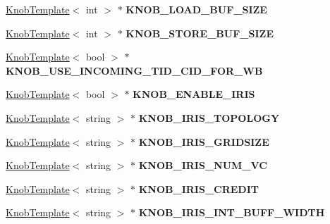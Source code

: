 \begin{DoxyCompactItemize}
\item 
\hypertarget{classall__knobs__c_ae0bb0c99188ceb39ac94fb6edba97e9d}{
\hyperlink{classKnobTemplate}{KnobTemplate}$<$ int $>$ $\ast$ {\bfseries KNOB\_\-LOAD\_\-BUF\_\-SIZE}}
\label{classall__knobs__c_ae0bb0c99188ceb39ac94fb6edba97e9d}

\item 
\hypertarget{classall__knobs__c_a403054f8d87ad3b9a664a2d6f05aff60}{
\hyperlink{classKnobTemplate}{KnobTemplate}$<$ int $>$ $\ast$ {\bfseries KNOB\_\-STORE\_\-BUF\_\-SIZE}}
\label{classall__knobs__c_a403054f8d87ad3b9a664a2d6f05aff60}

\item 
\hypertarget{classall__knobs__c_aa77af503bc3731e47846a690c1c3f21d}{
\hyperlink{classKnobTemplate}{KnobTemplate}$<$ bool $>$ $\ast$ {\bfseries KNOB\_\-USE\_\-INCOMING\_\-TID\_\-CID\_\-FOR\_\-WB}}
\label{classall__knobs__c_aa77af503bc3731e47846a690c1c3f21d}

\item 
\hypertarget{classall__knobs__c_af906b51a03ccfae4b9eb571f7b70bf10}{
\hyperlink{classKnobTemplate}{KnobTemplate}$<$ bool $>$ $\ast$ {\bfseries KNOB\_\-ENABLE\_\-IRIS}}
\label{classall__knobs__c_af906b51a03ccfae4b9eb571f7b70bf10}

\item 
\hypertarget{classall__knobs__c_ad5d433b7d83e8f2033d8e8cd4c15533d}{
\hyperlink{classKnobTemplate}{KnobTemplate}$<$ string $>$ $\ast$ {\bfseries KNOB\_\-IRIS\_\-TOPOLOGY}}
\label{classall__knobs__c_ad5d433b7d83e8f2033d8e8cd4c15533d}

\item 
\hypertarget{classall__knobs__c_ada52ff7353569eae0373b75372e6964e}{
\hyperlink{classKnobTemplate}{KnobTemplate}$<$ string $>$ $\ast$ {\bfseries KNOB\_\-IRIS\_\-GRIDSIZE}}
\label{classall__knobs__c_ada52ff7353569eae0373b75372e6964e}

\item 
\hypertarget{classall__knobs__c_addf3bd2be5776fc1c72f714979fa7e46}{
\hyperlink{classKnobTemplate}{KnobTemplate}$<$ string $>$ $\ast$ {\bfseries KNOB\_\-IRIS\_\-NUM\_\-VC}}
\label{classall__knobs__c_addf3bd2be5776fc1c72f714979fa7e46}

\item 
\hypertarget{classall__knobs__c_ac2164aa293d68ec2052dcd02f00bc8e6}{
\hyperlink{classKnobTemplate}{KnobTemplate}$<$ string $>$ $\ast$ {\bfseries KNOB\_\-IRIS\_\-CREDIT}}
\label{classall__knobs__c_ac2164aa293d68ec2052dcd02f00bc8e6}

\item 
\hypertarget{classall__knobs__c_a2cefacaea3725d2d3f575ed95ccb1095}{
\hyperlink{classKnobTemplate}{KnobTemplate}$<$ string $>$ $\ast$ {\bfseries KNOB\_\-IRIS\_\-INT\_\-BUFF\_\-WIDTH}}
\label{classall__knobs__c_a2cefacaea3725d2d3f575ed95ccb1095}


\end{DoxyCompactItemize}
